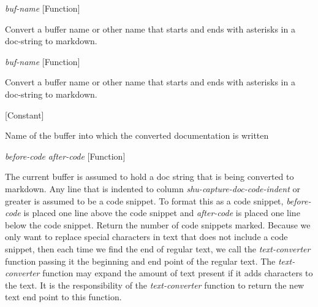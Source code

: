 \vspace{1em}
\noindent
{}
\usebox{\funcname}\emph{buf-name}
 \hfill [Function]

\begin{doc-string}
Convert a buffer name or other name that starts and ends with asterisks
 in a doc-string to markdown.
\end{doc-string}

\vspace{1em}
\noindent
{}
\usebox{\funcname}\emph{buf-name}
 \hfill [Function]

\begin{doc-string}
Convert a buffer name or other name that starts and ends with asterisks
 in a doc-string to markdown.
\end{doc-string}

\vspace{1em}
\noindent
{}
\usebox{\funcname}
 \hfill [Constant]

\begin{doc-string}
Name of the buffer into which the converted documentation is written
\end{doc-string}

\vspace{1em}
\noindent
{}
\usebox{\funcname}\emph{before-code} \emph{after-code}
 \hfill [Function]
\hspace*{\wd\funcname}

\begin{doc-string}
The current buffer is assumed to hold a doc string that is being converted to
markdown.  Any line that is indented to column \emph{shu-capture-doc-code-indent} or
greater is assumed to be a code snippet.  To format this as a code snippet,
\emph{before-code} is placed one line above the code snippet and \emph{after-code} is placed
one line below the code snippet.  Return the number of code snippets marked.
Because we only want to replace special characters in text that does not include
a code snippet, then each time we find the end of regular text, we call the
\emph{text-converter} function passing it the beginning and end point of the regular
text.  The \emph{text-converter} function may expand the amount of text present if it
adds characters to the text.  It is the responsibility of the \emph{text-converter}
function to return the new text end point to this function.
\end{doc-string}

